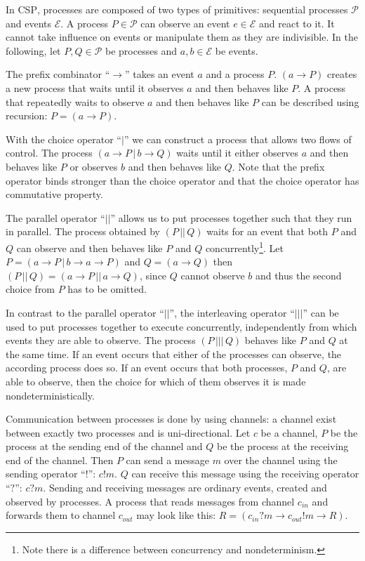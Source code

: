 In \textsc{CSP}, processes are composed of two types of primitives: sequential processes $\mathcal{P}$ and events $\mathcal{E}$. A process $P \in \mathcal{P}$ can observe an event $e \in \mathcal{E}$ and react to it. It cannot take influence on events or manipulate them as they are indivisible. In the following, let $P, Q \in \mathcal{P}$ be processes and $a,b \in \mathcal{E}$ be events.

The prefix combinator \enquote{$\to$} takes an event $a$ and a process $P$. $\left( a \to P \right)$ creates a new process that waits until it observes $a$ and then behaves like $P$. A process that repeatedly waits to observe $a$ and then behaves like $P$ can be described using recursion: $P = \left( a \to P \right)$.

With the choice operator \enquote{$|$} we can construct a process that allows two flows of control. The process $\left( a \to P \,|\, b \to Q \right)$ waits until it either observes $a$ and then behaves like $P$ or observes $b$ and then behaves like $Q$. Note that the prefix operator binds stronger than the choice operator and that the choice operator has commutative property.

The parallel operator \enquote{$||$} allows us to put processes together such that they run in parallel. The process obtained by $\left( P \,||\, Q \right)$ waits for an event that both $P$ and $Q$ can observe and then behaves like $P$ and $Q$ concurrently\footnote{Note there is a difference between concurrency and nondeterminism.}. Let $P = \left( a \to P \,|\, b \to a \to P \right)$ and $Q = \left( a \to Q \right)$ then $\left( P \,||\, Q \right) = \left( a \to P \,||\, a \to Q \right)$, since $Q$ cannot observe $b$ and thus the second choice from $P$ has to be omitted.

In contrast to the parallel operator \enquote{$||$}, the interleaving operator \enquote{$|||$} can be used to put processes together to execute concurrently, independently from which events they are able to observe. The process $\left( P \,|||\, Q \right)$ behaves like $P$ and $Q$ at the same time. If an event occurs that either of the processes can observe, the according process does so. If an event occurs that both processes, $P$ and $Q$, are able to observe, then the choice for which of them observes it is made nondeterministically.

Communication between processes is done by using channels: a channel exist between exactly two processes and is uni-directional. Let $c$ be a channel, $P$ be the process at the sending end of the channel and $Q$ be the process at the receiving end of the channel. Then $P$ can send a message $m$ over the channel using the sending operator \enquote{$!$}: $c!m$. $Q$ can receive this message using the receiving operator \enquote{$?$}: $c?m$. Sending and receiving messages are ordinary events, created and observed by processes. A process that reads messages from channel $c_{in}$ and forwards them to channel $c_{out}$ may look like this: $R = \left( c_{in}?m \to c_{out}!m \to R \right)$.

